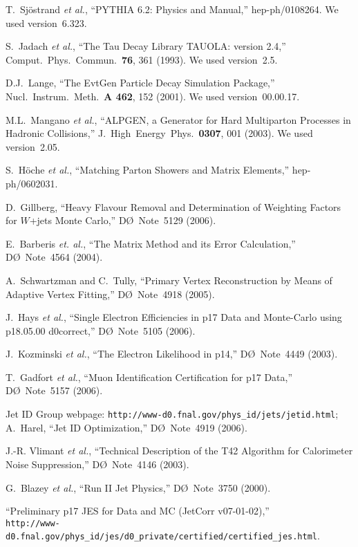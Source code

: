 \documentclass[aps]{revtex4}
\newcommand{\dzero}     {D\O}
\newcommand{\alpgen}    {\sc{alpgen}}
\begin{document}
\begin{thebibliography}{99.}
T.~Sj\"{o}strand {\it et al.},
``PYTHIA 6.2: Physics and Manual,''
hep-ph/0108264. We used version~6.323.

S.~Jadach {\it et al.},
``The Tau Decay Library TAUOLA: version 2.4,''
Comput.\ Phys.\ Commun.~{\bf 76}, 361 (1993). We used version~2.5.

D.J.~Lange,
``The EvtGen Particle Decay Simulation Package,''
Nucl.\ Instrum.\ Meth.~{\bf A 462}, 152 (2001). We used
version~00.00.17.

M.L.~Mangano {\it et al.},
``ALPGEN, a Generator for Hard Multiparton Processes in Hadronic
Collisions,''
J.\ High~Energy~Phys.~{\bf 0307}, 001 (2003). We used {\alpgen}
version~2.05.

S.~H\"{o}che {\it et al.},
``Matching Parton Showers and Matrix Elements,''
hep-ph/0602031.

D.~Gillberg,
``Heavy Flavour Removal and Determination of Weighting Factors for
{\alpgen} $W$+jets Monte Carlo,''
{\dzero}~Note~5129 (2006).

E.~Barberis {\it et. al.},
``The Matrix Method and its Error Calculation,''
{\dzero}~Note~4564 (2004).

A.~Schwartzman and C.~Tully,
``Primary Vertex Reconstruction by Means of Adaptive Vertex Fitting,''
{\dzero}~Note~4918 (2005).

J.~Hays {\it et al.},
``Single Electron Efficiencies in p17 Data and Monte-Carlo using
p18.05.00 d0correct,''
{\dzero}~Note~5105 (2006).

J.~Kozminski {\it et al.}, 
``The Electron Likelihood in p14,'' 
{\dzero}~Note~4449 (2003).

T.~Gadfort {\it et al.}, 
``Muon Identification Certification for p17 Data,''
{\dzero}~Note~5157 (2006).

Jet ID Group webpage:
\texttt{http://www-d0.fnal.gov/phys\_id/jets/jetid.html};\\
A.~Harel,
``Jet ID Optimization,''
{\dzero}~Note~4919 (2006).

J.-R. Vlimant {\it et al.},
``Technical Description of the T42 Algorithm for Calorimeter
Noise Suppression,'' 
{\dzero}~Note~4146 (2003).

G.~Blazey {\it et al.},
``Run II Jet Physics,''
{\dzero}~Note~3750 (2000).

``Preliminary p17 JES for Data and MC (JetCorr v07-01-02),''\\
\texttt{http://www-d0.fnal.gov/phys\_id/jes/d0\_private/certified/certified\_jes.html}.


\end{thebibliography}
\end{document}
